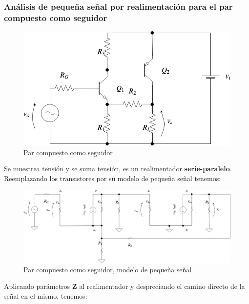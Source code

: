\subsubsection{Análisis de pequeña señal por realimentación para el par compuesto como seguidor}


\begin{figure}[H] %
\begin{center}
\includegraphics[width=0.9 \textwidth, angle=0]{./img/sziklai/sziklai1.png}
\caption{\label{fig:fig_sziklai_cir_1}\footnotesize{Par compuesto como seguidor}}
\end{center}
\end{figure}

Se muestrea tensión y se suma tensión, es un realimentador \textbf{serie-paralelo}. Reemplazando los transistores por su modelo de pequeña señal tenemos:

\vfill

\clearpage


\begin{figure}[H] %
\begin{center}
\includegraphics[width=0.9 \textwidth, angle=0]{./img/sziklai/sziklai2.png}
\caption{\label{fig:fig_sziklai_cir_2}\footnotesize{Par compuesto como seguidor, modelo de pequeña señal}}
\end{center}
\end{figure}


Aplicando parámetros \textbf{Z} al realimentador y despreciando el camino directo de la señal en el mismo, tenemos:


